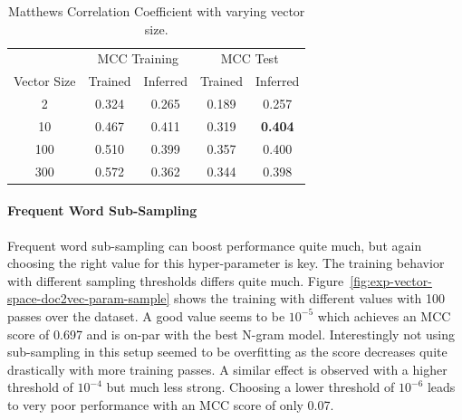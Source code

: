 \begin{table}[h]
  \begin{center}
    \begin{tabular}{ c | *2c | *2c }
      \toprule
       & \multicolumn{2}{c|}{MCC Training} & \multicolumn{2}{|c}{MCC Test}\\
      Vector Size & Trained & Inferred & Trained & Inferred \\
      \midrule
      2 & 0.324 & 0.265 & 0.189 & 0.257 \\
      10 & 0.467 & 0.411 & 0.319 & \textbf{0.404} \\
      100 & 0.510 & 0.399 & 0.357 & 0.400 \\
      300 & 0.572 & 0.362 & 0.344 & 0.398 \\
      \bottomrule
    \end{tabular}
  \caption{Matthews Correlation Coefficient with varying vector size.}
\label{tab:Paragraph Vector Parameter Results Size}
\end{center}
\end{table}

\paragraph{Frequent Word Sub-Sampling}
Frequent word sub-sampling can boost performance quite much, but again choosing the right value for this hyper-parameter is key. The training behavior with different sampling thresholds differs quite much. Figure~\ref{fig:exp-vector-space-doc2vec-param-sample} shows the training with different values with 100 passes over the dataset. A good value seems to be $10^{-5}$ which achieves an MCC score of 0.697 and is on-par with the best N-gram model. Interestingly not using sub-sampling in this setup seemed to be overfitting as the score decreases quite drastically with more training passes. A similar effect is observed with a higher threshold of $10^{-4}$ but much less strong. Choosing a lower threshold of $10^{-6}$ leads to very poor performance with an MCC score of only 0.07.

